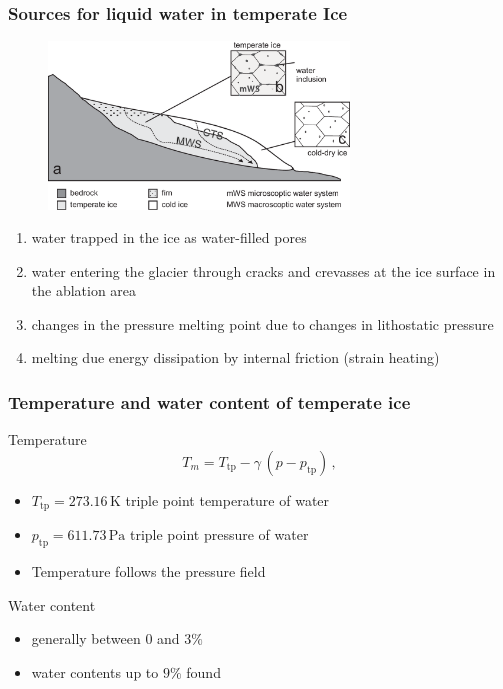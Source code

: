 \documentclass[hide notes,intlimits,handout]{beamer}
\newcommand{\unit}[1]{\ensuremath{\,\text{#1}}}
\begin{document}
\begin{frame}
  \frametitle{Sources for liquid water in temperate Ice}
  \vspace{-1em}
  \begin{figure}
    \includegraphics[width=8cm]{figures/mws}
  \end{figure}
  \begin{enumerate} \small
  \item<1-2> water trapped in the ice as water-filled pores
  \item<1-2> water entering the glacier through cracks and crevasses at the ice surface in the ablation area
  \item<1,3> changes in the pressure melting point due to changes in lithostatic pressure
  \item<1,3> melting due energy dissipation by internal friction (strain heating) 
  \end{enumerate}  
\end{frame}




\begin{frame}
  \frametitle{Temperature and water content of temperate ice}
  \begin{block}{Temperature}
    \begin{equation}
      \label{eq:clausius-pure}
      T_m = T_{\text{tp}} - \gamma\, (p - p_{\text{tp}})\,,
    \end{equation}
    \begin{itemize}
    \item $T_{\text{tp}}=273.16\unit{K}$ triple point temperature of water
    \item $p_{\text{tp}}=611.73\unit{Pa}$ triple point pressure of water
    \item Temperature follows the pressure field
    \end{itemize}
  \end{block}
  \begin{block}{Water content}
    \begin{itemize}
    \item generally between 0 and $3\%$
    \item water contents up to $9\%$ found
    \end{itemize}
  \end{block}
\end{frame}
\end{document}
